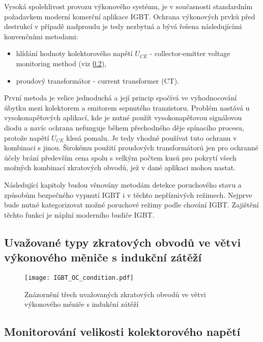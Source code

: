      Vysoká spolehlivost provozu výkonového systému, je v současnosti standardním požadavkem moderní komerční aplikace 
     IGBT. Ochrana výkonových prvků před destrukcí v případě nadproudu je tedy nezbytná a bývá řešena následujícími 
     konvenčními metodami:
     \begin{itemize}
       \item hlídání hodnoty kolektorového napětí $U_{CE}$ - collector-emitter voltage monitoring method (viz \ref{PVE:Vce_monitoring}),
       \item proudový transformátor - current transformer (CT).
     \end{itemize}
     První metoda je velice jednoduchá a její princip spočívá ve vyhodnocování úbytku mezi kolektorem a emitorem 
     sepnutého tranzistoru. Problém nastává u vysokonapěťových aplikací, kde je nutné použít vysokonapěťovou signálovou 
     diodu a navíc ochrana nefunguje během přechodného děje spínacího procesu, protože napětí $U_{CE}$ klesá pomalu. 
     Je tedy vhodné používat tuto ochranu v kombinaci s jinou. Širokému použití proudových transformátorů jen pro 
     ochranné účely brání především cena spolu s velkým počtem kusů pro pokrytí všech možných kombinací zkratových 
     obvodů, jež v dané aplikaci mohou nastat.

     Následující kapitoly budou věnovány metodám detekce poruchového stavu a způsobům bezpečného vypnutí IGBT i v 
     těchto nepříznivých režimech. Nejprve bude nutné kategorizovat možné poruchové režimy podle chování IGBT. 
     Zajištění těchto funkcí je náplní moderního budiče IGBT.

     \subsection{Uvažované typy zkratových obvodů ve větvi vý\-ko\-no\-vého měniče s indukční zátěží}
       \begin{figure}[ht!]
         \centering
         \texttt{[image: IGBT\_OC\_condition.pdf]}
         \caption[Kategorie zkratových obvodů]{Znázornění třech uvažovaných zkratových obvodů ve
                  větvi výkonového měniče s indukční zátěží}\label{VE:fig_OC_condition}
       \end{figure}

     \subsection{Monitorování velikosti kolektorového napětí}\label{PVE:Vce_monitoring}
